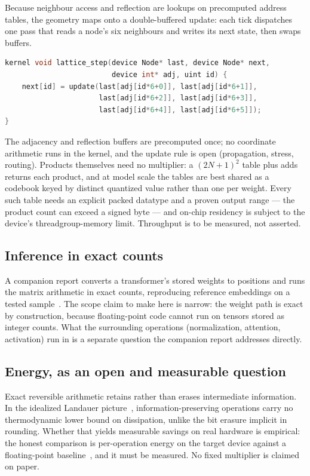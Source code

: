 \documentclass[11pt]{article}
\theoremstyle{definition}
\theoremstyle{remark}
\begin{document}
Because neighbour access and reflection are lookups on precomputed address
tables, the geometry maps onto a double-buffered update: each tick dispatches one
pass that reads a node's six neighbours and writes its next state, then swaps
buffers.
\begin{lstlisting}[language=C]
kernel void lattice_step(device Node* last, device Node* next,
                         device int* adj, uint id) {
    next[id] = update(last[adj[id*6+0]], last[adj[id*6+1]],
                      last[adj[id*6+2]], last[adj[id*6+3]],
                      last[adj[id*6+4]], last[adj[id*6+5]]);
}
\end{lstlisting}
The adjacency and reflection buffers are precomputed once; no coordinate
arithmetic runs in the kernel, and the update rule is open (propagation, stress,
routing). Products themselves need no multiplier: a $(2N+1)^2$ table plus adds
returns each product, and at model scale the tables are best shared as a codebook
keyed by distinct quantized value rather than one per weight. Every such table
needs an explicit packed datatype and a proven output range --- the product count
can exceed a signed byte --- and on-chip residency is subject to the device's
threadgroup-memory limit. Throughput is to be measured, not asserted.

\subsection{Inference in exact counts}
\label{ss:ai}

A companion report converts a transformer's stored weights to positions and runs
the matrix arithmetic in exact counts, reproducing reference embeddings on a
tested sample~\cite{phibaseAI}. The scope claim to make here is narrow: the
weight path is exact by construction, because floating-point code cannot run on
tensors stored as integer counts. What the surrounding operations (normalization,
attention, activation) run in is a separate question the companion report
addresses directly.

\subsection{Energy, as an open and measurable question}
\label{ss:energy}

Exact reversible arithmetic retains rather than erases intermediate information.
In the idealized Landauer picture~\cite{landauer,bennett}, information-preserving
operations carry no thermodynamic lower bound on dissipation, unlike the bit
erasure implicit in rounding. Whether that yields measurable savings on real
hardware is empirical: the honest comparison is per-operation energy on the
target device against a floating-point baseline~\cite{horowitz}, and it must be
measured. No fixed multiplier is claimed on paper.
\end{document}
